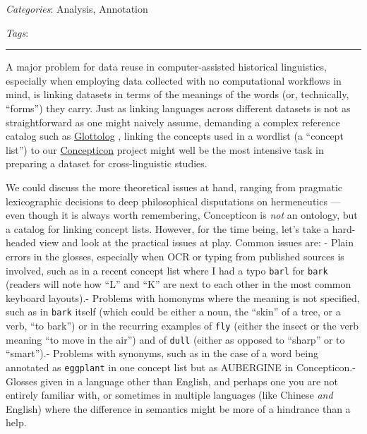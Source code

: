 \documentclass[
  a4paper,
  14pt,
  oneside,
  tablecaptionabove
]{scrbook}
\newcommand{\passthrough}[1]{#1}
\begin{document}
\emph{Categories}: Analysis, Annotation

\emph{Tags}:

\begin{center}\rule{0.5\linewidth}{1pt}\end{center}

A major problem for data reuse in computer-assisted historical
linguistics, especially when employing data collected with no
computational workflows in mind, is linking datasets in terms of the
meanings of the words (or, technically, \enquote{forms}) they carry.
Just as linking languages across different datasets is not as
straightforward as one might naively assume, demanding a complex
reference catalog such as \href{https://glottolog.org/}{Glottolog} ,
linking the concepts used in a wordlist (a \enquote{concept list}) to
our \href{https://concepticon.clld.org/}{Concepticon} project might well
be the most intensive task in preparing a dataset for cross-linguistic
studies.

We could discuss the more theoretical issues at hand, ranging from
pragmatic lexicographic decisions to deep philosophical disputations on
hermeneutics --- even though it is always worth remembering, Concepticon
is \emph{not} an ontology, but a catalog for linking concept lists.
However, for the time being, let's take a hard-headed view and look at
the practical issues at play. Common issues are: - Plain errors in the
glosses, especially when OCR or typing from published sources is
involved, such as in a recent concept list where I had a typo
\passthrough{\lstinline!barl!} for \passthrough{\lstinline!bark!}
(readers will note how \enquote{L} and \enquote{K} are next to each
other in the most common keyboard layouts).- Problems with homonyms
where the meaning is not specified, such as in
\passthrough{\lstinline!bark!} itself (which could be either a noun, the
\enquote{skin} of a tree, or a verb, \enquote{to bark}) or in the
recurring examples of \passthrough{\lstinline!fly!} (either the insect
or the verb meaning \enquote{to move in the air}) and of
\passthrough{\lstinline!dull!} (either as opposed to \enquote{sharp} or
to \enquote{smart}).- Problems with synonyms, such as in the case of a
word being annotated as \passthrough{\lstinline!eggplant!} in one
concept list but as AUBERGINE in Concepticon.- Glosses given in a
language other than English, and perhaps one you are not entirely
familiar with, or sometimes in multiple languages (like Chinese
\emph{and} English) where the difference in semantics might be more of a
hindrance than a help.
\end{document}
